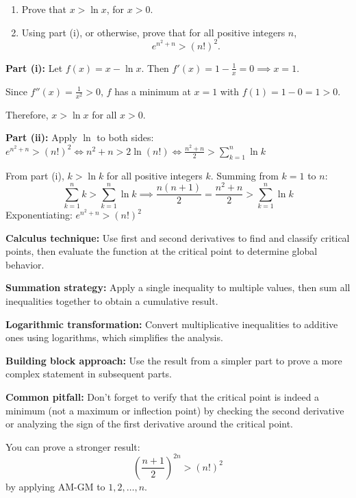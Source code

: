 \begin{problem}
\begin{enumerate}[label=(\roman*)]
    \item Prove that $x > \ln x$, for $x > 0$.
    \item Using part (i), or otherwise, prove that for all positive integers $n$,
    $$e^{n^2+n} > (n!)^2.$$
\end{enumerate}
\end{problem}

\begin{solution}
\textbf{Part (i):} Let $f(x) = x - \ln x$. Then $f'(x) = 1 - \frac{1}{x} = 0 \implies x = 1$.

Since $f''(x) = \frac{1}{x^2} > 0$, $f$ has a minimum at $x=1$ with $f(1) = 1 - 0 = 1 > 0$.

Therefore, $x > \ln x$ for all $x > 0$.

\textbf{Part (ii):} Apply $\ln$ to both sides: $e^{n^2+n} > (n!)^2 \iff n^2+n > 2\ln(n!) \iff \frac{n^2+n}{2} > \sum_{k=1}^{n} \ln k$

From part (i), $k > \ln k$ for all positive integers $k$. Summing from $k=1$ to $n$:
\[
\sum_{k=1}^{n} k > \sum_{k=1}^{n} \ln k \implies \frac{n(n+1)}{2} = \frac{n^2+n}{2} > \sum_{k=1}^{n} \ln k
\]
Exponentiating: $e^{n^2+n} > (n!)^2$
\end{solution}

\begin{takeaways}

    \item \textbf{Calculus technique:} Use first and second derivatives to find and classify critical points, then evaluate the function at the critical point to determine global behavior.
    \item \textbf{Summation strategy:} Apply a single inequality to multiple values, then sum all inequalities together to obtain a cumulative result.
    \item \textbf{Logarithmic transformation:} Convert multiplicative inequalities to additive ones using logarithms, which simplifies the analysis.
    \item \textbf{Building block approach:} Use the result from a simpler part to prove a more complex statement in subsequent parts.
    \item \textbf{Common pitfall:} Don't forget to verify that the critical point is indeed a minimum (not a maximum or inflection point) by checking the second derivative or analyzing the sign of the first derivative around the critical point.
    \item You can prove a stronger result: $$\left( \frac{n+1}{2} \right)^{2n} > (n!)^2$$ by applying AM-GM to $1, 2, \ldots, n$.

\end{takeaways}

